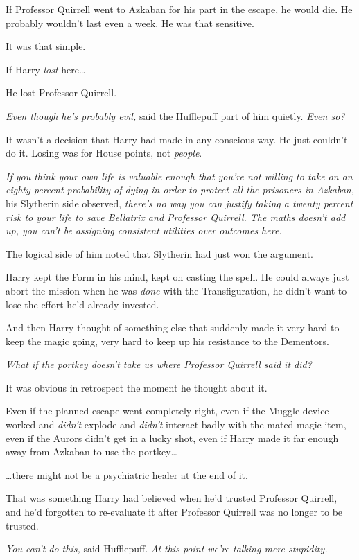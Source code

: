 If Professor Quirrell went to Azkaban for his part in the escape, he would die. He probably wouldn't last even a week. He was that sensitive.

It was that simple.

If Harry \emph{lost} here{\ldots}

He lost Professor Quirrell.

\emph{Even though he's probably evil,} said the Hufflepuff part of him quietly. \emph{Even so?}

It wasn't a decision that Harry had made in any conscious way. He just couldn't do it. Losing was for House points, not \emph{people}.

\emph{If you think your own life is valuable enough that you're not willing to take on an eighty percent probability of dying in order to protect all the prisoners in Azkaban,} his Slytherin side observed, \emph{there's no way you can justify taking a twenty percent risk to your life to save Bellatrix and Professor Quirrell. The maths doesn't add up, you can't be assigning consistent utilities over outcomes here.}

The logical side of him noted that Slytherin had just won the argument.

Harry kept the Form in his mind, kept on casting the spell. He could always just abort the mission when he was \emph{done} with the Transfiguration, he didn't want to lose the effort he'd already invested.

And then Harry thought of something else that suddenly made it very hard to keep the magic going, very hard to keep up his resistance to the Dementors.

\emph{What if the portkey doesn't take us where Professor Quirrell said it did?}

It was obvious in retrospect the moment he thought about it.

Even if the planned escape went completely right, even if the Muggle device worked and \emph{didn't} explode and \emph{didn't} interact badly with the mated magic item, even if the Aurors didn't get in a lucky shot, even if Harry made it far enough away from Azkaban to use the portkey{\ldots}

{\ldots}there might not be a psychiatric healer at the end of it.

That was something Harry had believed when he'd trusted Professor Quirrell, and he'd forgotten to re-evaluate it after Professor Quirrell was no longer to be trusted.

\emph{You can't do this,} said Hufflepuff. \emph{At this point we're talking mere stupidity.}

